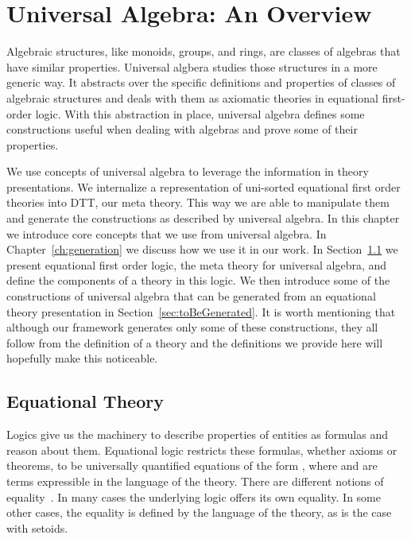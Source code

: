 \chapter{Universal Algebra: An Overview}
\label{ch:ualgebra}
Algebraic structures, like monoids, groups, and rings, are classes of algebras that have similar properties. Universal algbera studies those structures in a more generic way. It abstracts over the specific definitions and properties of classes of algebraic structures and deals with them as axiomatic theories in equational first-order logic. With this abstraction in place, universal algebra defines some constructions useful when dealing with algebras and prove some of their properties.

We use concepts of universal algebra to leverage the information in theory presentations. We internalize a representation of uni-sorted equational first order theories into DTT, our meta theory. This way we are able to manipulate them and generate the constructions as described by universal algebra. In this chapter we introduce core concepts that we use from universal algebra. In Chapter~\ref{ch:generation} we discuss how we use it in our work. In Section~\ref{sec:eqtheory} we present equational first order logic, the meta theory for universal algebra, and define the components of a theory in this logic. We then introduce some of the constructions of universal algebra that can be generated from an equational theory presentation in Section~\ref{sec:toBeGenerated}. It is worth mentioning that although our framework generates only some of these constructions, they all follow from the definition of a theory and the definitions we provide here will hopefully make this noticeable.   

\section{Equational Theory}
\label{sec:eqtheory}
Logics give us the machinery to describe properties of entities as formulas and reason about them.  
Equational logic restricts these formulas, whether axioms or theorems, to be universally quantified equations of the form , where  and   are terms expressible in the language of the theory. There are different notions of equality~\cite{oneThingSame2008, equalityInTPs2015}. In many cases the underlying logic offers its own equality. In some other cases, the equality is defined by the language of the theory, as is the case with setoids. 

